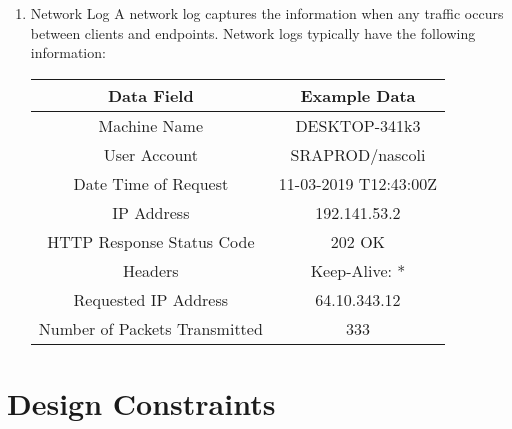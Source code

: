 \documentclass{scrreprt}
\begin{document}
\begin{enumerate}[resume*]
    \item Network Log
	\subitem A network log captures the information when any traffic occurs between clients and endpoints. Network logs typically have the following information:
         \subitem
	\begin{tabular}{|c|c|}
        \hline
         \textbf{Data Field} & \textbf{Example Data}\\
        \hline
         Machine Name & DESKTOP-341k3 \\
        \hline
        User Account & SRAPROD/nascoli\\
        \hline
	Date Time of Request &  11-03-2019 T12:43:00Z \\ 
        \hline
	IP Address & 192.141.53.2 \\
        \hline
	HTTP Response Status Code &  202 OK\\
	\hline
	Headers & Keep-Alive: *\\
	\hline
	Requested IP Address & 64.10.343.12\\
	\hline
	Number of Packets Transmitted & 333\\
	\hline
\end{tabular}
\end{enumerate}

\section{Design Constraints}
\end{document}
